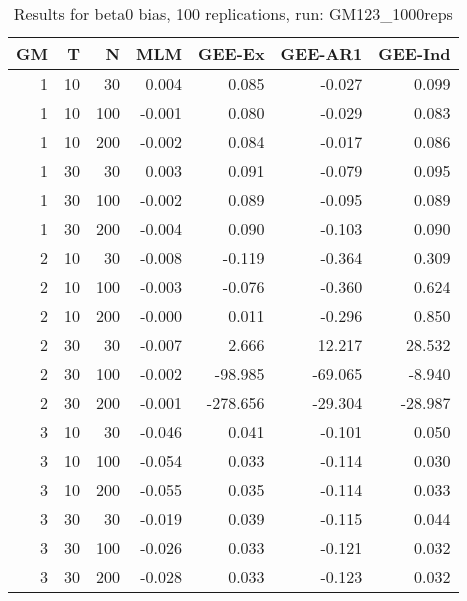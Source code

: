 \begin{table}[ht]
\centering
\begin{tabular}{rrrrrrr}
  \hline
GM & T & N & MLM & GEE-Ex & GEE-AR1 & GEE-Ind \\ 
  \hline
1 & 10 & 30 & 0.004 & 0.085 & -0.027 & 0.099 \\ 
  1 & 10 & 100 & -0.001 & 0.080 & -0.029 & 0.083 \\ 
  1 & 10 & 200 & -0.002 & 0.084 & -0.017 & 0.086 \\ 
  1 & 30 & 30 & 0.003 & 0.091 & -0.079 & 0.095 \\ 
  1 & 30 & 100 & -0.002 & 0.089 & -0.095 & 0.089 \\ 
  1 & 30 & 200 & -0.004 & 0.090 & -0.103 & 0.090 \\ 
   \hline
2 & 10 & 30 & -0.008 & -0.119 & -0.364 & 0.309 \\ 
  2 & 10 & 100 & -0.003 & -0.076 & -0.360 & 0.624 \\ 
  2 & 10 & 200 & -0.000 & 0.011 & -0.296 & 0.850 \\ 
  2 & 30 & 30 & -0.007 & 2.666 & 12.217 & 28.532 \\ 
  2 & 30 & 100 & -0.002 & -98.985 & -69.065 & -8.940 \\ 
  2 & 30 & 200 & -0.001 & -278.656 & -29.304 & -28.987 \\ 
   \hline
3 & 10 & 30 & -0.046 & 0.041 & -0.101 & 0.050 \\ 
  3 & 10 & 100 & -0.054 & 0.033 & -0.114 & 0.030 \\ 
  3 & 10 & 200 & -0.055 & 0.035 & -0.114 & 0.033 \\ 
  3 & 30 & 30 & -0.019 & 0.039 & -0.115 & 0.044 \\ 
  3 & 30 & 100 & -0.026 & 0.033 & -0.121 & 0.032 \\ 
  3 & 30 & 200 & -0.028 & 0.033 & -0.123 & 0.032 \\ 
   \hline
\end{tabular}
\caption{Results for beta0 bias, 100 replications, run: GM123_1000reps} 
\label{tab:beta0_bias}
\end{table}
